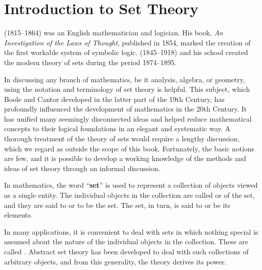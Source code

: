 \section{Introduction to Set Theory}\label{sec:1.2.1}

\begin{note}
  \href{https://en.wikipedia.org/wiki/George_Boole}{} (1815--1864) was an English mathematician and logician.
  His book, \emph{An Investigation of the Laws of Thought}, published in 1854, marked the creation of the first workable system of symbolic logic.
  \href{https://en.wikipedia.org/wiki/Georg_Cantor}{} (1845--1918) and his school created the modern theory of sets during the period 1874--1895.
\end{note}

\begin{note}
  In discussing any branch of mathematics, be it analysis, algebra, or geometry, using the notation and terminology of set theory is helpful.
  This subject, which Boole and Cantor developed in the latter part of the 19th Century, has profoundly influenced the development of mathematics in the 20th Century.
  It has unified many seemingly disconnected ideas and helped reduce mathematical concepts to their logical foundations in an elegant and systematic way.
  A thorough treatment of the theory of sets would require a lengthy discussion, which we regard as outside the scope of this book.
  Fortunately, the basic notions are few, and it is possible to develop a working knowledge of the methods and ideas of set theory through an informal discussion.
\end{note}

\begin{defn}\label{defn:1.2.1}
  In mathematics, the word ``\textbf{set}'' is used to represent a collection of objects viewed as a single entity.
  The individual objects in the collection are called \textbf{} or \textbf{} of the set, and they are said to \textbf{} or to be \textbf{} the set.
  The set, in turn, is said to \textbf{} or be \textbf{} its elements.
\end{defn}

\begin{note}
  In many applications, it is convenient to deal with sets in which nothing special is assumed about the nature of the individual objects in the collection.
  These are called \textbf{}.
  Abstract set theory has been developed to deal with such collections of arbitrary objects, and from this generality, the theory derives its power.
\end{note}
